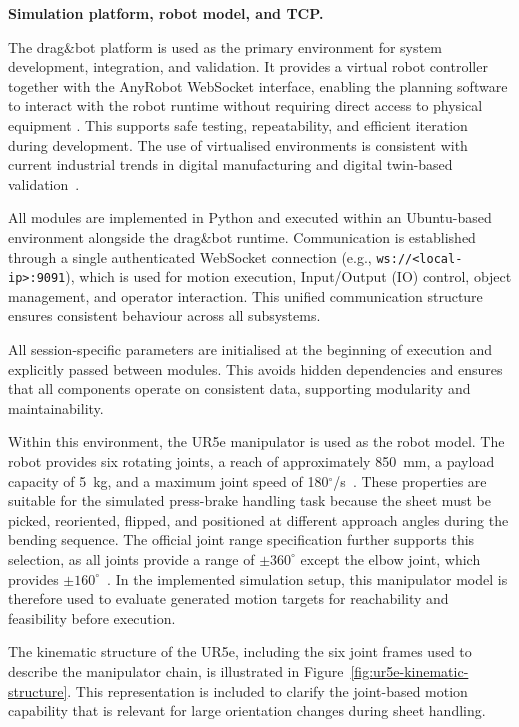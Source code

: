 \label{sec:simulation-platform}
\noindent\textbf{Simulation platform, robot model, and TCP.}

The drag\&bot platform is used as the primary environment for system development, integration, and validation. It provides a virtual robot controller together with the AnyRobot WebSocket interface, enabling the planning software to interact with the robot runtime without requiring direct access to physical equipment \cite{dragandbot_anyrobot_2025}. This supports safe testing, repeatability, and efficient iteration during development. The use of virtualised environments is consistent with current industrial trends in digital manufacturing and digital twin-based validation~\cite{Tao2021DigitalTwin}.

All modules are implemented in Python and executed within an Ubuntu-based environment alongside the drag\&bot runtime. Communication is established through a single authenticated WebSocket connection (e.g., \texttt{ws://<local-ip>:9091}), which is used for motion execution, Input/Output (IO) control, object management, and operator interaction. This unified communication structure ensures consistent behaviour across all subsystems.

All session-specific parameters are initialised at the beginning of execution and explicitly passed between modules. This avoids hidden dependencies and ensures that all components operate on consistent data, supporting modularity and maintainability.

Within this environment, the UR5e manipulator is used as the robot model. The robot provides six rotating joints, a reach of approximately 850~mm, a payload capacity of 5~kg, and a maximum joint speed of 180$^\circ$/s~\cite{universalrobots_ur5e}. These properties are suitable for the simulated press-brake handling task because the sheet must be picked, reoriented, flipped, and positioned at different approach angles during the bending sequence. The official joint range specification further supports this selection, as all joints provide a range of $\pm 360^\circ$ except the elbow joint, which provides $\pm 160^\circ$~\cite{universalrobots_ur5e}. In the implemented simulation setup, this manipulator model is therefore used to evaluate generated motion targets for reachability and feasibility before execution.

The kinematic structure of the UR5e, including the six joint frames used to describe the manipulator chain, is illustrated in Figure~\ref{fig:ur5e-kinematic-structure}. This representation is included to clarify the joint-based motion capability that is relevant for large orientation changes during sheet handling.

